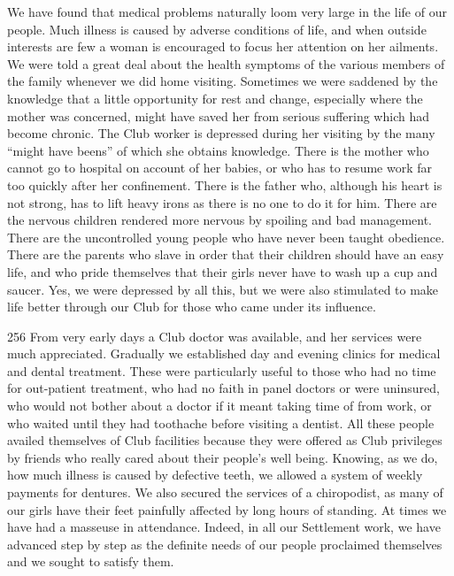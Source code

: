 We have found that medical problems naturally loom
very large in the life of our people. Much illness is
caused by adverse conditions of life, and when outside
interests are few a woman is encouraged to focus her
attention on her ailments. We were told a great deal
about the health symptoms of the various members of
the family whenever we did home visiting. Sometimes we
were saddened by the knowledge that a little opportunity
for rest and change, especially where the mother was
concerned, might have saved her from serious suffering
which had become chronic. The Club worker is
depressed during her visiting by the many “might have
beens” of which she obtains knowledge. There is the
mother who cannot go to hospital on account of her
babies, or who has to resume work far too quickly after
her confinement. There is the father who, although his
heart is not strong, has to lift heavy irons as there is
no one to do it for him. There are the nervous children
rendered more nervous by spoiling and bad management.
There are the uncontrolled young people who have never
been taught obedience. There are the parents who slave
in order that their children should have an easy life, and
who pride themselves that their girls never have to wash
up a cup and saucer. Yes, we were depressed by all this,
but we were also stimulated to make life better through
our Club for those who came under its influence.

\begin{tp}{256}
From very early days a Club doctor was available, and
her services were much appreciated. Gradually we established
day and evening clinics for medical and dental
treatment. These were particularly useful to those who
had no time for out-patient treatment, who had
no faith in panel doctors or were uninsured, who
would not bother about a doctor if it meant taking time
of from work, or who waited until they had toothache
before visiting a dentist. All these people availed themselves
of Club facilities because they were offered as Club
privileges by friends who really cared about their people's
well being. Knowing, as we do, how much illness is
caused by defective teeth, we allowed a system of weekly
payments for dentures. We also secured the services of
a chiropodist, as many of our girls have their feet painfully
affected by long hours of standing. At times we have
had a masseuse in attendance. Indeed, in all our Settlement
work, we have advanced step by step as the definite
needs of our people proclaimed themselves and we sought
to satisfy them.
\end{tp}


